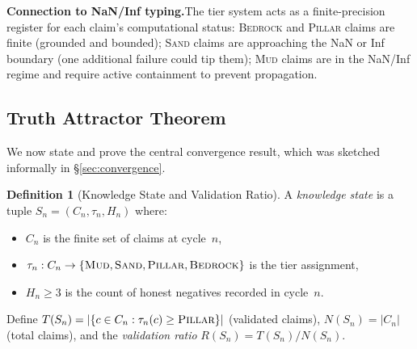 \documentclass[11pt]{article}
\theoremstyle{definition}
\newtheorem{definition}[theorem]{Definition}
\theoremstyle{remark}
\newcommand{\BEDROCK}{\textsc{Bedrock}}
\newcommand{\PILLAR}{\textsc{Pillar}}
\newcommand{\SAND}{\textsc{Sand}}
\newcommand{\MUD}{\textsc{Mud}}
\begin{document}
\noindent\textbf{Connection to NaN/Inf typing.}\quad The tier system acts as a
finite-precision register for each claim's computational status:
\BEDROCK{} and \PILLAR{} claims are finite (grounded and bounded);
\SAND{} claims are approaching the NaN or Inf boundary (one additional failure
could tip them);
\MUD{} claims are in the NaN/Inf regime and require active containment to
prevent propagation.

\subsection{Truth Attractor Theorem}
\label{sec:truth-attractor-theorem}

We now state and prove the central convergence result, which was sketched
informally in \S\ref{sec:convergence}.

\begin{definition}[Knowledge State and Validation Ratio]
\label{def:knowledge-state}
A \emph{knowledge state} is a tuple $S_n = (C_n, \tau_n, H_n)$ where:
\begin{itemize}
  \item $C_n$ is the finite set of claims at cycle~$n$,
  \item $\tau_n : C_n \to \{\MUD, \SAND, \PILLAR, \BEDROCK\}$ is the tier
    assignment,
  \item $H_n \geq 3$ is the count of honest negatives recorded in cycle~$n$.
\end{itemize}
Define $T(S_n) = |\{c \in C_n : \tau_n(c) \geq \PILLAR\}|$ (validated
claims), $N(S_n) = |C_n|$ (total claims), and the \emph{validation ratio}
$R(S_n) = T(S_n) / N(S_n)$.
\end{definition}
\end{document}
